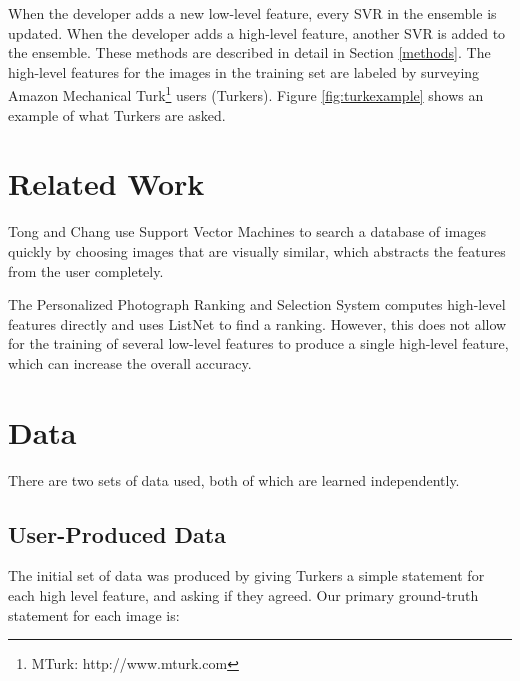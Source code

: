 \documentclass[11pt,letter]{article}
\begin{document}
When the developer adds a new low-level feature, every SVR in the ensemble is updated. When the developer adds a high-level feature, another SVR is added to the ensemble. These methods are described in detail in Section \ref{methods}. The high-level features for the images in the training set are labeled by surveying Amazon Mechanical Turk\footnote{MTurk: http://www.mturk.com} users (Turkers). Figure \ref{fig:turkexample} shows an example of what Turkers are asked.

\begin{figure*}[h!]
  \centering
  \caption{This is what Turkers see when rating the image. Here, there are two high level features: blur quality and exposure quality. The first statement (``This image is high quality'') is the ground truth. See Section \ref{turkdata} for details.}
  \label{fig:turkexample}
\end{figure*}

\section{Related Work}
Tong and Chang\cite{Tong:2001:SVM:500141.500159} use Support Vector Machines to search a database of images quickly by choosing images that are visually similar, which abstracts the features from the user completely.

The Personalized Photograph Ranking and Selection System\cite{Yeh:2010:PPR:1873951.1873963} computes high-level features directly and uses ListNet\cite{Cao:2007:LRP:1273496.1273513} to find a ranking. However, this does not allow for the training of several low-level features to produce a single high-level feature, which can increase the overall accuracy.

\section{Data}

There are two sets of data used, both of which are learned independently.

\subsection{User-Produced Data}
\label{turkdata}
The initial set of data was produced by giving Turkers a simple statement for each high level feature, and asking if they agreed. Our primary ground-truth statement for each image is:
\end{document}

